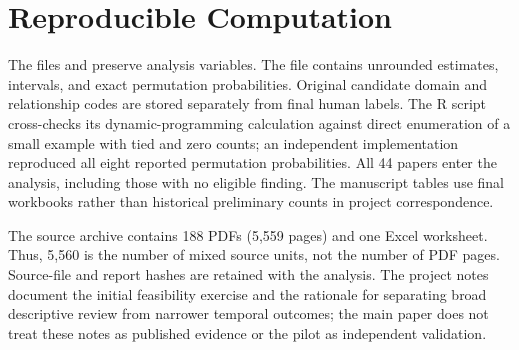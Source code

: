 \documentclass[11pt,a4paper]{article}
\begin{document}
\section{Reproducible Computation}
The files  and  preserve analysis variables. The file  contains unrounded estimates, intervals, and exact permutation probabilities. Original candidate domain and relationship codes are stored separately from final human labels. The R script cross-checks its dynamic-programming calculation against direct enumeration of a small example with tied and zero counts; an independent implementation reproduced all eight reported permutation probabilities. All 44 papers enter the analysis, including those with no eligible finding. The manuscript tables use final workbooks rather than historical preliminary counts in project correspondence.

The source archive contains 188 PDFs (5,559 pages) and one Excel worksheet. Thus, 5,560 is the number of mixed source units, not the number of PDF pages. Source-file and report hashes are retained with the analysis. The project notes document the initial feasibility exercise and the rationale for separating broad descriptive review from narrower temporal outcomes; the main paper does not treat these notes as published evidence or the pilot as independent validation.
\end{document}
